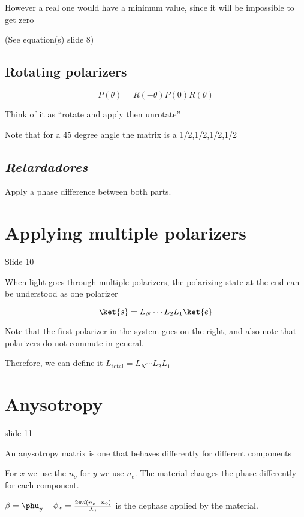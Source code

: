 \documentclass[../main/main.tex]{subfiles}
\begin{document}
However a real one would have a minimum value, since it will be impossible to get zero

(See equation(s) slide 8)


\subsection{Rotating polarizers}

\begin{equation}
	P(\theta) = R(-\theta) P(0) R(\theta)
\end{equation}

Think of it as ``rotate and apply then unrotate''

Note that for a 45 degree angle the matrix is a 1/2,1/2,1/2,1/2

\subsection{\emph{Retardadores}}

Apply a phase difference between both parts.

\section{Applying multiple polarizers}

Slide 10

When light goes through multiple polarizers, the polarizing state at the end can be understood as one polarizer

\begin{equation}
	\ket{s}  = L_N \cdots L_2 L_1 \ket{e}
\end{equation}

Note that the first polarizer in the system goes on the right, and also note that polarizers do not commute in general.

Therefore, we can define it $L_{\textrm{total}} = L_N \cdots L_2 L_1$


\section{Anysotropy}

slide 11

An anysotropy matrix is one that behaves differently for different components

For $x$ we use the $n_o$ for $y$ we use $n_e$. The material changes the phase differently for each component.

$\beta = \phu_y - \phi_x = \frac{2 \pi d (n_e - n_0)}{\lambda_0}$ is the dephase applied by the material.
\end{document}

